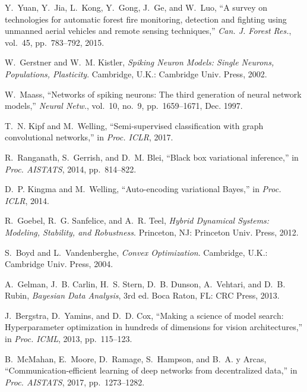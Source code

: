 \documentclass[10pt,journal,compsoc]{IEEEtran}
\begin{document}
\begin{thebibliography}{99}
Y.~Yuan, Y.~Jia, L.~Kong, Y.~Gong, J.~Ge, and W.~Luo, ``A survey on technologies for automatic forest fire monitoring, detection and fighting using unmanned aerial vehicles and remote sensing techniques,'' \emph{Can. J. Forest Res.}, vol.~45, pp.~783--792, 2015.

W.~Gerstner and W.~M. Kistler, \emph{Spiking Neuron Models: Single Neurons, Populations, Plasticity}. Cambridge, U.K.: Cambridge Univ. Press, 2002.

W.~Maass, ``Networks of spiking neurons: The third generation of neural network models,'' \emph{Neural Netw.}, vol.~10, no.~9, pp.~1659--1671, Dec. 1997.

T.~N. Kipf and M.~Welling, ``Semi-supervised classification with graph convolutional networks,'' in \emph{Proc. ICLR}, 2017.

R.~Ranganath, S.~Gerrish, and D.~M. Blei, ``Black box variational inference,'' in \emph{Proc. AISTATS}, 2014, pp.~814--822.

D.~P. Kingma and M.~Welling, ``Auto-encoding variational Bayes,'' in \emph{Proc. ICLR}, 2014.

R.~Goebel, R.~G. Sanfelice, and A.~R. Teel, \emph{Hybrid Dynamical Systems: Modeling, Stability, and Robustness}. Princeton, NJ: Princeton Univ. Press, 2012.

S.~Boyd and L.~Vandenberghe, \emph{Convex Optimization}. Cambridge, U.K.: Cambridge Univ. Press, 2004.

A.~Gelman, J.~B. Carlin, H.~S. Stern, D.~B. Dunson, A.~Vehtari, and D.~B. Rubin, \emph{Bayesian Data Analysis}, 3rd ed. Boca Raton, FL: CRC Press, 2013.

J.~Bergstra, D.~Yamins, and D.~D. Cox, ``Making a science of model search: Hyperparameter optimization in hundreds of dimensions for vision architectures,'' in \emph{Proc. ICML}, 2013, pp.~115--123.

B.~McMahan, E.~Moore, D.~Ramage, S.~Hampson, and B.~A. y Arcas, ``Communication-efficient learning of deep networks from decentralized data,'' in \emph{Proc. AISTATS}, 2017, pp.~1273--1282.

\end{thebibliography}
\end{document}
